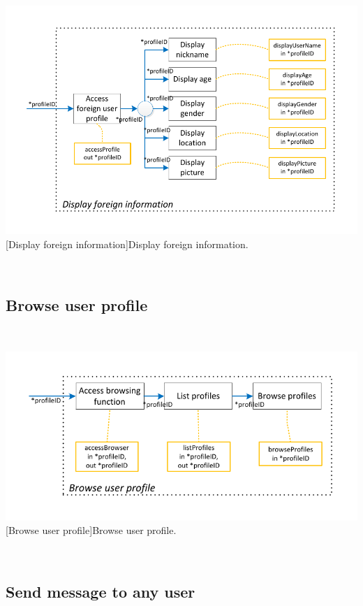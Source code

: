 \documentclass[11pt, a4paper,svglistings,oneside]{book}
\begin{document}
$\;$ \\
\noindent\begin{minipage}{\textwidth}
    \centering
   \includegraphics[scale=1]{Nav_DisplayForeignInformation.pdf}
 [Display foreign information]{Display foreign information.}
\end{minipage}
$\;$ \\ 

\subsection{Browse user profile}

$\;$ \\
\noindent\begin{minipage}{\textwidth}
    \centering
   \includegraphics[scale=1]{nav_BrowsUserProfile2.pdf}
 [Browse user profile]{Browse user profile.}
\end{minipage}
$\;$ \\ 

\subsection{Send message to any user}
\end{document}
